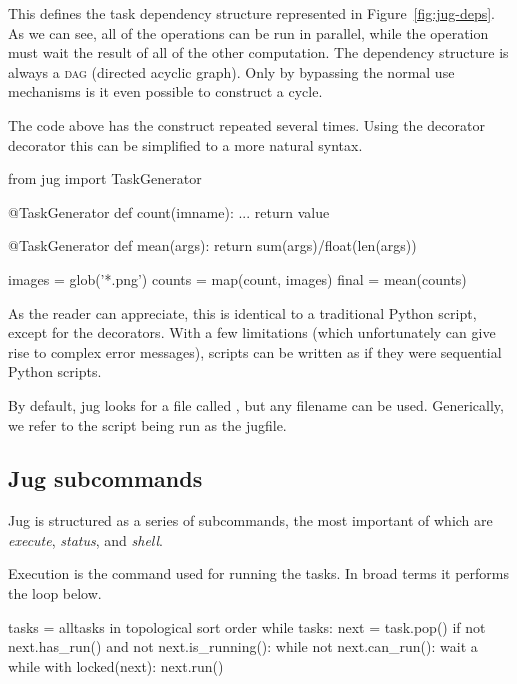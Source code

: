 \documentclass{article}
\begin{document}
This defines the task dependency structure represented in
Figure~\ref{fig:jug-deps}. As we can see, all of the  operations
can be run in parallel, while the  operation must wait the result of
all of the other computation. The dependency structure is always a \textsc{dag}
(directed acyclic graph). Only by bypassing the normal use mechanisms is it
even possible to construct a cycle.

The code above has the construct  repeated several times.
Using the decorator  decorator this can be simplified to a
more natural syntax.

\begin{python}
from jug import TaskGenerator

@TaskGenerator
def count(imname):
    ...
    return value

@TaskGenerator
def mean(args):
    return sum(args)/float(len(args))

images = glob('*.png')
counts = map(count, images)
final = mean(counts)
\end{python}

As the reader can appreciate, this is identical to a traditional Python script,
except for the  decorators. With a few limitations (which
unfortunately can give rise to complex error messages), scripts can be written
as if they were sequential Python scripts.

By default, jug looks for a file called , but any filename can
be used. Generically, we refer to the script being run as the jugfile.

\subsection{Jug subcommands}

Jug is structured as a series of subcommands, the most important of which are
\emph{execute}, \emph{status}, and \emph{shell}.

Execution is the command used for running the tasks. In broad terms it performs
the loop below.

\begin{python}
tasks = alltasks in topological sort order
while tasks:
    next = task.pop()
    if not next.has_run() and not next.is_running():
        while not next.can_run():
            wait a while
        with locked(next):
            next.run()
\end{python}
\end{document}
